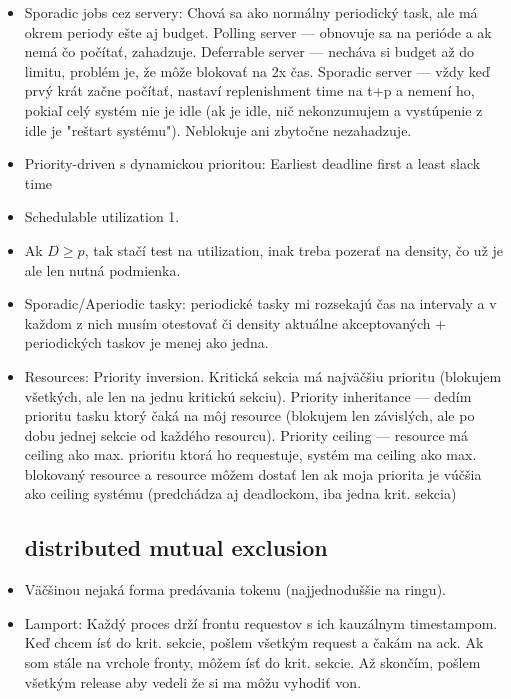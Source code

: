 \documentclass[paper=a4, fontsize=11pt]{scrartcl} %
\numberwithin{equation}{section} %
\numberwithin{figure}{section} %
\numberwithin{table}{section} %
\begin{document}
\begin{itemize}
	\item Sporadic jobs cez servery: Chová sa ako normálny periodický task, ale má okrem periody ešte aj budget. Polling server — obnovuje sa na perióde a ak nemá čo počítať, zahadzuje. Deferrable server — necháva si budget až do limitu, problém je, že môže blokovať na 2x čas. Sporadic server — vždy keď prvý krát začne počítať, nastaví replenishment time na t+p a nemení ho, pokiaľ celý systém nie je idle (ak je idle, nič nekonzumujem a vystúpenie z idle je "reštart systému"). Neblokuje ani zbytočne nezahadzuje.
	
	\item Priority-driven s dynamickou prioritou: Earliest deadline first a least slack time
	
	\item Schedulable utilization 1.
	
	\item Ak $D \geq p$, tak stačí test na utilization, inak treba pozerať na density, čo už je ale len nutná podmienka.
	
	\item Sporadic/Aperiodic tasky: periodické tasky mi rozsekajú čas na intervaly a v každom z nich musím otestovať či density aktuálne akceptovaných + periodických taskov je menej ako jedna.
	
	\item Resources: Priority inversion. Kritická sekcia má najväčšiu prioritu (blokujem všetkých, ale len na jednu kritickú sekciu). Priority inheritance — dedím prioritu tasku ktorý čaká na môj resource (blokujem len závislých, ale po dobu jednej sekcie od každého resourcu). Priority ceiling — resource má ceiling ako max. prioritu ktorá ho requestuje, systém ma ceiling ako max. blokovaný resource a resource môžem dostať len ak moja priorita je vúčšia ako ceiling systému (predchádza aj deadlockom, iba jedna krit. sekcia) 
	
	\subsection{distributed mutual exclusion}
	
	\item Väčšinou nejaká forma predávania tokenu (najjednoduššie na ringu).
	
	\item Lamport: Každý proces drží frontu requestov s ich kauzálnym timestampom. Keď chcem ísť do krit. sekcie, pošlem všetkým request a čakám na ack. Ak som stále na vrchole fronty, môžem ísť do krit. sekcie. Až skončím, pošlem všetkým release aby vedeli že si ma môžu vyhodiť von.
	

\end{itemize}
\end{document}
